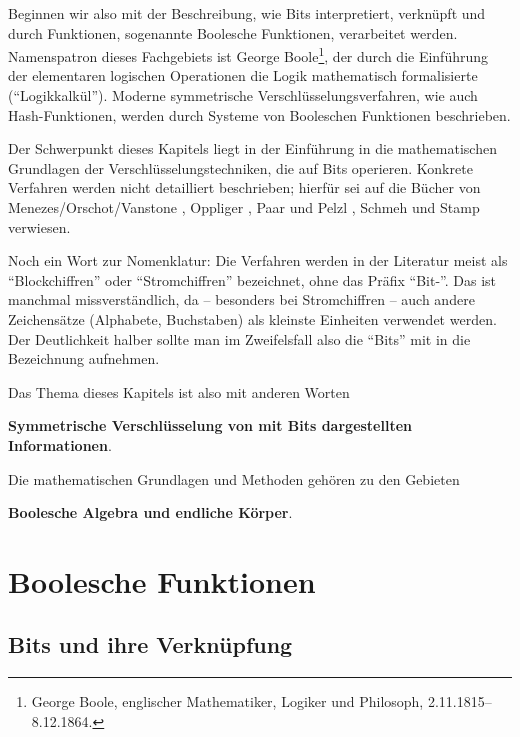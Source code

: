 \begin{refsegment}
Beginnen wir also mit der Beschreibung, wie Bits interpretiert, verknüpft
und durch Funktionen, sogenannte Boolesche
Funktionen, verarbeitet werden.
Namenspatron dieses Fachgebiets ist
George Boole\footnote{%
  George Boole, englischer Mathematiker, Logiker und Philosoph,
  2.11.1815--8.12.1864.
},
der durch die Einführung der elementaren logischen Operationen die Logik
mathematisch formalisierte ("`Logikkalkül"').
Moderne symmetrische Verschlüsselungsverfahren, wie auch
Hash-Funktionen,
werden durch Systeme von Booleschen Funktionen beschrieben.

Der Schwerpunkt dieses Kapitels liegt in der Einführung in die
mathematischen Grundlagen der Verschlüsselungstechniken, die auf
Bits operieren. Konkrete Verfahren werden nicht detailliert beschrieben;
hierfür sei auf die Bücher von
Menezes/Orschot/Vanstone \cite{Menezes2001},
Oppliger \cite{Oppliger2011},
Paar und Pelzl \cite{PaPe2009},
Schmeh \cite{Schm2003, Schm2016}
und Stamp \cite{Stamp2007} verwiesen.

Noch ein Wort zur Nomenklatur: Die Verfahren werden in der Literatur
meist als "`Blockchiffren"' oder
"`Stromchiffren"' bezeichnet, ohne
das Präfix "`Bit-"'. Das ist manchmal missverständlich, da -- besonders
bei Stromchiffren -- auch andere Zeichensätze (Alphabete, Buchstaben)
als kleinste Einheiten verwendet werden. Der Deutlichkeit halber
sollte man im Zweifelsfall also die "`Bits"' mit in die Bezeichnung
aufnehmen.

Das Thema dieses Kapitels ist also mit anderen Worten

   \textbf{Symmetrische Verschlüsselung von mit Bits dargestellten Informationen}.

Die mathematischen Grundlagen und Methoden gehören zu den Gebieten

   \textbf{Boolesche Algebra
   und endliche Körper}.


\section{Boolesche Funktionen}\label{s-bool-fct}
\subsection{Bits und ihre Verknüpfung}\label{s-bool-bit}


\end{refsegment}
